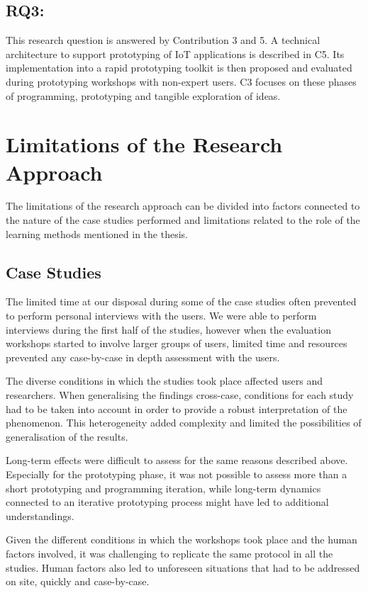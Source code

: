 \subsection*{RQ3: \RQiii}
\label{rq3}
This research question is answered by Contribution 3 and 5. A technical architecture to support prototyping of IoT applications is described in C5. Its implementation into a rapid prototyping toolkit is then proposed and evaluated during prototyping workshops with non-expert users. C3 focuses on these phases of programming, prototyping and tangible exploration of ideas.


\section{Limitations of the Research Approach}

The limitations of the research approach can be divided into factors connected to the nature of the case studies performed and limitations related to the role of the learning methods mentioned in the thesis.

\subsection{Case Studies}
The limited time at our disposal during some of the case studies often prevented to perform personal interviews with the users. We were able to perform interviews during the first half of the studies, however when the evaluation workshops started to involve larger groups of users, limited time and resources prevented any case-by-case in depth assessment with the users.

The diverse conditions in which the studies took place affected users and researchers. When generalising the findings cross-case, conditions for each study had to be taken into account in order to provide a robust interpretation of the phenomenon. This heterogeneity added complexity and limited the possibilities of generalisation of the results.

Long-term effects were difficult to assess for the same reasons described above. Especially for the prototyping phase, it was not possible to assess more than a short prototyping and programming iteration, while long-term dynamics connected to an iterative prototyping process might have led to additional understandings.

Given the different conditions in which the workshops took place and the human factors involved, it was challenging to replicate the same protocol in all the studies. Human factors also led to unforeseen situations that had to be addressed on site, quickly and case-by-case.

